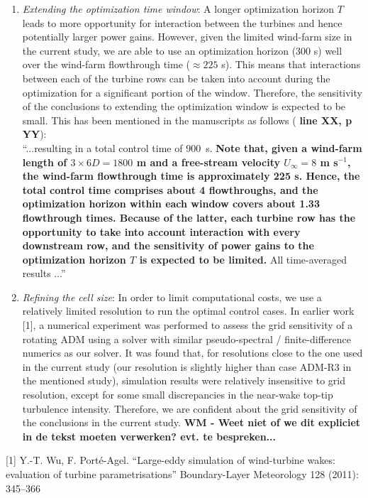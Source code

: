\documentclass[]{article}
\newcommand{\red}[1]{\textbf{\color{red} #1}}
\newcommand{\revision}[1]{\textbf{#1}}
\begin{document}
\begin{itemize}
\begin{enumerate}
		\item \textit{Extending the optimization time window}: A longer optimization horizon $T$ leads to more opportunity for interaction between the turbines and hence potentially larger power gains. However, given the limited wind-farm size in the current study, we are able to use an optimization horizon (300 s) well over the wind-farm flowthrough time ($\approx 225$ s). This means that interactions between each of the turbine rows can be taken into account during the optimization for a significant portion of the window. Therefore, the sensitivity of the conclusions to extending the optimization window is expected to be small. This has been mentioned in the manuscripts as follows (\red{line XX, p YY}): \\``...resulting in a total control time of 900~s. \revision{Note that, given a wind-farm length of $3 \times 6D = 1 800$ m and a free-stream velocity $U_\infty = 8$ m s$^{-1}$, the wind-farm flowthrough time is approximately 225 s. Hence, the total control time comprises about 4 flowthroughs, and the optimization horizon within each window covers about 1.33 flowthrough times. Because of the latter, each turbine row has the opportunity to take into account interaction with every downstream row, and the sensitivity of power gains to the optimization horizon $T$ is expected to be limited.} All time-averaged results ...''
		\item \textit{Refining the cell size}: In order to limit computational costs, we use a relatively limited resolution to run the optimal control cases. In earlier work [1], a numerical experiment was performed to assess the grid sensitivity of a rotating ADM using a solver with similar pseudo-spectral / finite-difference numerics as our solver. It was found that, for resolutions close to the one used in the current study (our resolution is slightly higher than case ADM-R3 in the mentioned study), simulation results were relatively insensitive to grid resolution, except for some small discrepancies in the near-wake top-tip turbulence intensity. Therefore, we are confident about the grid sensitivity of the conclusions in the current study. \red{WM - Weet niet of we dit expliciet in de tekst moeten verwerken? evt. te bespreken...}
	\end{enumerate}
\end{itemize}

[1] Y.-T. Wu, F. Port\'e-Agel. ``Large-eddy simulation of wind-turbine wakes: evaluation of turbine parametrisations'' Boundary-Layer Meteorology 128 (2011): 345--366

\hrulefill
\end{document}
